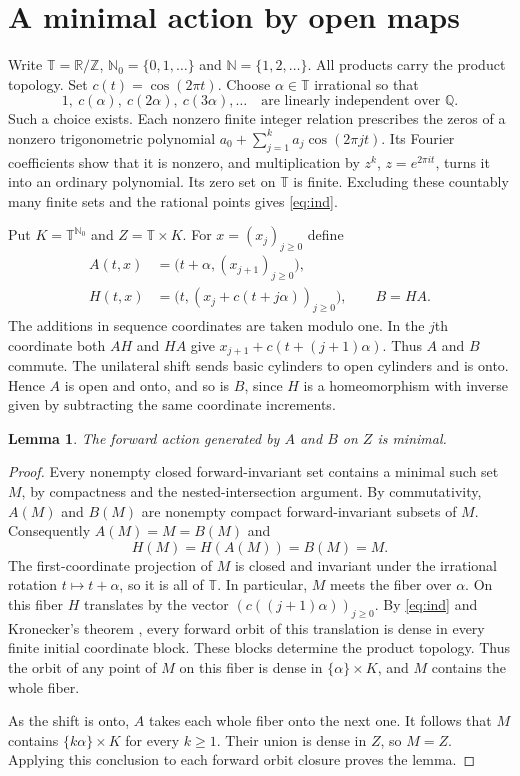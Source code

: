 \documentclass[11pt,a4paper]{article}
\newcommand{\T}{\mathbb{T}}
\newcommand{\N}{\mathbb{N}}
\newcommand{\NN}{\mathbb{N}_0}
\newtheorem{lemma}[theorem]{Lemma}
\begin{document}
\section{A minimal action by open maps}
Write $\T=\mathbb R/\mathbb Z$, $\NN=\{0,1,\ldots\}$ and
$\N=\{1,2,\ldots\}$. All products carry the product topology.
Set $c(t)=\cos(2\pi t)$. Choose $\alpha\in\T$ irrational so that
\begin{equation}\label{eq:ind}
1,\ c(\alpha),\ c(2\alpha),\ c(3\alpha),\ldots
\quad\text{are linearly independent over }\mathbb Q.
\end{equation}
Such a choice exists. Each nonzero finite integer relation prescribes the
zeros of a nonzero trigonometric polynomial
$a_0+\sum_{j=1}^{k}a_j\cos(2\pi jt)$. Its Fourier coefficients show that
it is nonzero, and multiplication by $z^k$, $z=e^{2\pi i t}$, turns it into
an ordinary polynomial. Its zero set on $\T$ is finite. Excluding these
countably many finite sets and the rational points gives \eqref{eq:ind}.

Put $K=\T^{\NN}$ and $Z=\T\times K$. For $x=(x_j)_{j\ge0}$ define
\begin{align*}
 A(t,x)&=\bigl(t+\alpha,(x_{j+1})_{j\ge0}\bigr),\\
 H(t,x)&=\bigl(t,(x_j+c(t+j\alpha))_{j\ge0}\bigr), \qquad B=H A .
\end{align*}
The additions in sequence coordinates are taken modulo one. In the
$j$th coordinate both $AH$ and $HA$ give $x_{j+1}+c(t+(j+1)\alpha)$.
Thus $A$ and $B$ commute. The unilateral shift sends basic cylinders to
open cylinders and is onto. Hence $A$ is open and onto, and so is $B$,
since $H$ is a homeomorphism with inverse given by subtracting the same
coordinate increments.

\begin{lemma}\label{lem:min}
The forward action generated by $A$ and $B$ on $Z$ is minimal.
\end{lemma}
\begin{proof}
Every nonempty closed forward-invariant set contains a minimal such set
$M$, by compactness and the nested-intersection argument. By commutativity,
$A(M)$ and $B(M)$ are nonempty compact forward-invariant subsets of $M$.
Consequently $A(M)=M=B(M)$ and
\[
 H(M)=H(A(M))=B(M)=M.
\]
The first-coordinate projection of $M$ is closed and invariant under the
irrational rotation $t\mapsto t+\alpha$, so it is all of $\T$. In particular,
$M$ meets the fiber over $\alpha$. On this fiber $H$ translates by the
vector $(c((j+1)\alpha))_{j\ge0}$. By \eqref{eq:ind} and Kronecker's
theorem \cite[Theorem 2.39]{EFHN}, every forward orbit of this translation
is dense in every finite initial coordinate block. These blocks determine
the product topology. Thus the orbit of any point of $M$ on this fiber
is dense in $\{\alpha\}\times K$, and $M$ contains the whole fiber.

As the shift is onto, $A$ takes each whole fiber onto the next one.
It follows that $M$ contains $\{k\alpha\}\times K$ for every $k\ge1$.
Their union is dense in $Z$, so $M=Z$. Applying this conclusion to each
forward orbit closure proves the lemma.
\end{proof}
\end{document}
